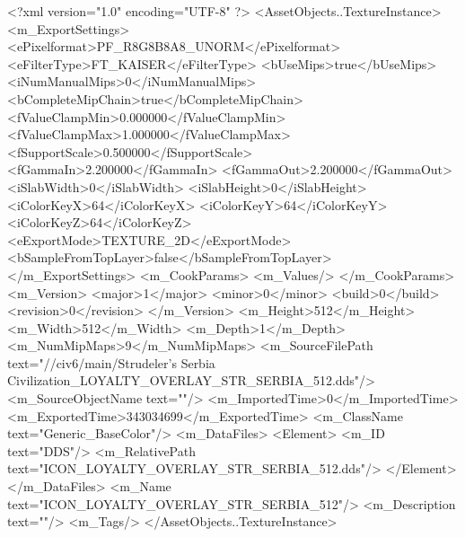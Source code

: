 <?xml version="1.0" encoding="UTF-8" ?>
<AssetObjects..TextureInstance>
	<m_ExportSettings>
		<ePixelformat>PF_R8G8B8A8_UNORM</ePixelformat>
		<eFilterType>FT_KAISER</eFilterType>
		<bUseMips>true</bUseMips>
		<iNumManualMips>0</iNumManualMips>
		<bCompleteMipChain>true</bCompleteMipChain>
		<fValueClampMin>0.000000</fValueClampMin>
		<fValueClampMax>1.000000</fValueClampMax>
		<fSupportScale>0.500000</fSupportScale>
		<fGammaIn>2.200000</fGammaIn>
		<fGammaOut>2.200000</fGammaOut>
		<iSlabWidth>0</iSlabWidth>
		<iSlabHeight>0</iSlabHeight>
		<iColorKeyX>64</iColorKeyX>
		<iColorKeyY>64</iColorKeyY>
		<iColorKeyZ>64</iColorKeyZ>
		<eExportMode>TEXTURE_2D</eExportMode>
		<bSampleFromTopLayer>false</bSampleFromTopLayer>
	</m_ExportSettings>
	<m_CookParams>
		<m_Values/>
	</m_CookParams>
	<m_Version>
		<major>1</major>
		<minor>0</minor>
		<build>0</build>
		<revision>0</revision>
	</m_Version>
	<m_Height>512</m_Height>
	<m_Width>512</m_Width>
	<m_Depth>1</m_Depth>
	<m_NumMipMaps>9</m_NumMipMaps>
	<m_SourceFilePath text="//civ6/main/Strudeler's Serbia Civilization\ArtFiles\ICON_LOYALTY_OVERLAY_STR_SERBIA_512.dds"/>
	<m_SourceObjectName text=""/>
	<m_ImportedTime>0</m_ImportedTime>
	<m_ExportedTime>343034699</m_ExportedTime>
	<m_ClassName text="Generic_BaseColor"/>
	<m_DataFiles>
		<Element>
			<m_ID text="DDS"/>
			<m_RelativePath text="ICON_LOYALTY_OVERLAY_STR_SERBIA_512.dds"/>
		</Element>
	</m_DataFiles>
	<m_Name text="ICON_LOYALTY_OVERLAY_STR_SERBIA_512"/>
	<m_Description text=""/>
	<m_Tags/>
</AssetObjects..TextureInstance>


